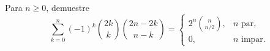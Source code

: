 Para \(n\ge0\), demuestre
\[\sum_{k=0}^n (-1)^k \binom{2k}{k} \binom{2n-2k}{n-k}
  = \begin{cases}
    2^n \binom{n}{n/2}, & n\text{ par},\\
    0, & n\text{ impar}.
  \end{cases}\]
